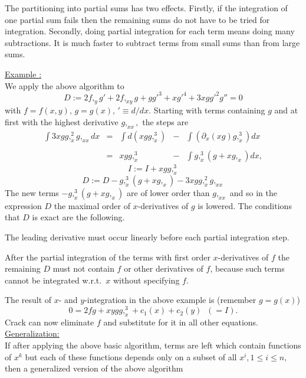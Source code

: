 \documentclass[12pt]{article}
\begin{document}
The partitioning into partial sums has two effects. Firstly, if the
integration of one partial sum fails then the remaining sums do not have
to be tried for integration. Secondly, doing partial integration for
each term means doing many subtractions. It is much faster to subtract
terms from small sums than from large sums.

\underline{Example :} \\
We apply the above algorithm to
\begin{equation}
D := 2f,_yg' + 2f,_{xy}g + gg'^3 + xg'^4 + 3xgg'^2g'' = 0
\label{D}
\end{equation}
with $f = f(x,y), \, g = g(x), \, '\equiv d/dx.$
Starting with terms containing $g$
and at first with the highest derivative $g,_{xx},$ the steps are
\[
\begin{array}{rcccl}
\int 3xgg,_x^2g,_{xx} dx
& = & \int d(xgg,_x^3)
    & - & \int \left( \partial_x(xg) g,_x^3\right) dx \\ \\
& = & xgg,_x^3 & - & \int g,_x^3(g + xg,_x) dx,
\end{array} \]
\[ I := I + xgg,_x^3 \]
\[ D := D - g,_x^3(g + xg,_x) - 3xgg,_x^2g,_{xx} \]
The new terms $- g,_x^3(g + xg,_x)$ are of lower order than $g,_{xx}$
and so in the expression $D$ the maximal order of $x$-derivatives
of $g$ is lowered. The conditions that $D$ is exact are the following.
\begin{description}
\item The leading derivative must occur linearly before each partial
integration step.
\item After the partial integration of the terms with first order
$x$-derivatives of $f$ the remaining $D$ must not contain $f$
or other derivatives of $f$, because such terms cannot
be integrated w.r.t.\ $x$ without specifying $f$.
\end{description}
The result of $x$- and $y$-integration in the above example is
(remember $g=g(x)$)
\begin{equation}
0 = 2fg + xygg,_x^3 + c_1(x) + c_2(y) \; \; (=I). \nonumber
\end{equation}
{\sc Crack} can now eliminate $f$ and substitute
for it in all other equations. \\
\underline{Generalization:} \\
If after applying the above basic algorithm, terms are left which contain
functions of $x^k$ but each of these functions depends only on a subset of
all $x^i, 1\leq i\leq n,$ then a generalized version of the above algorithm
\end{document}
